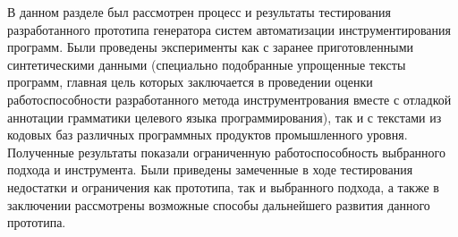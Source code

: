 В данном разделе был рассмотрен процесс и результаты тестирования разработанного прототипа генератора систем автоматизации инструментирования программ.
Были проведены эксперименты как с заранее приготовленными синтетическими данными (специально подобранные упрощенные тексты программ, главная цель которых заключается в проведении оценки работоспособности разработанного метода инструментрования вместе с отладкой аннотации грамматики целевого языка программирования), так и с текстами из кодовых баз различных программных продуктов промышленного уровня.
Полученные результаты показали ограниченную работоспособность выбранного подхода и инструмента.
Были приведены замеченные в ходе тестирования недостатки и ограничения как прототипа, так и выбранного подхода, а также в заключении рассмотрены возможные способы дальнейшего развития данного прототипа.
